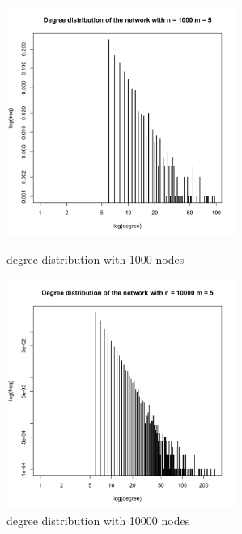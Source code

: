 \documentclass[draftcls,12pt,onecolumn]{IEEEtran}
\begin{document}
\begin{figure}[htbp]
\centering
\begin{minipage}[t]{0.48\textwidth}
\centering
\includegraphics[width=7.5cm]{img/2_g_2_degree1}
\caption{degree distribution with 1000 nodes}
\end{minipage}
\begin{minipage}[t]{0.48\textwidth}
\centering
\includegraphics[width=7.5cm]{img/2_g_2_degree2}
\caption{degree distribution with 10000 nodes}
\end{minipage}
\end{figure}
\end{document}
